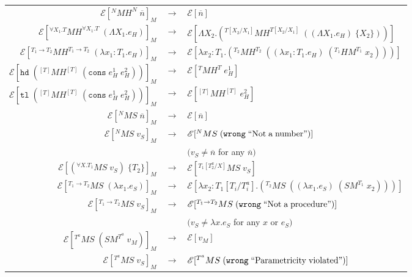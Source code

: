 \begin{figure}
\onehalfspacing
\begin{center}
\begin{tabular}{rcl}
$\mathscr{E}[^{N}MH^{N}\;\overline{n}]_{M}$ & $\rightarrow$ & $\mathscr{E}[\overline{n}]$ \\
$\mathscr{E}[^{\forall X_{1}.T}MH^{\forall X_{1}.T}\;(\Lambda X_{1}.e_{H})]_{M}$ & $\rightarrow$ & $\mathscr{E}[\Lambda X_{2}.(^{T[X_{2}/X_{1}]}MH^{T[X_{2}/X_{1}]}\;((\Lambda X_{1}.e_{H})\;\lbrace X_{2}\rbrace))]$ \\
$\mathscr{E}[^{T_{1}\rightarrow T_{2}}MH^{T_{1}\rightarrow T_{2}}\;(\lambda x_{1}:T_{1}.e_{H})]_{M}$ & $\rightarrow$ & $\mathscr{E}[\lambda x_{2}:T_{1}.(^{T_{2}}MH^{T_{2}}\;((\lambda x_{1}:T_{1}.e_{H})\;(^{T_{1}}HM^{T_{1}}\;x_{2})))]$ \\
$\mathscr{E}[\mathtt{hd}\;(^{[T]}MH^{[T]}\;(\mathtt{cons}\;e_{H}^{1}\;e_{H}^{2}))]_{M}$ & $\rightarrow$ & $\mathscr{E}[^{T}MH^{T}\;e_{H}^{1}]$ \\
$\mathscr{E}[\mathtt{tl}\;(^{[T]}MH^{[T]}\;(\mathtt{cons}\;e_{H}^{1}\;e_{H}^{2}))]_{M}$ & $\rightarrow$ & $\mathscr{E}[^{[T]}MH^{[T]}\;e_{H}^{2}]$ \\
$\mathscr{E}[^{N}MS\;\overline{n}]_{M}$ & $\rightarrow$ & $\mathscr{E}[\overline{n}]$ \\
$\mathscr{E}[^{N}MS\;v_{S}]_{M}$ & $\rightarrow$ & $\mathscr{E}[^{N}MS\;(\mathtt{wrong}\;\mathrm{``Not\;a\;number"})]$ \\
&& $(v_{S}\neq\overline{n}$ for any $\overline{n})$ \\
$\mathscr{E}[(^{\forall X.T_{1}}MS\;v_{S})\;\lbrace T_{2}\rbrace]_{M}$ & $\rightarrow$ & $\mathscr{E}[^{T_{1}[T^{a}_{2}/X]}MS\;v_{S}]$ \\
$\mathscr{E}[^{T_{1}\rightarrow T_{2}}MS\;(\lambda x_{1}.e_{S})]_{M}$ & $\rightarrow$ & $\mathscr{E}[\lambda x_{2}:T_{1}[T_{i}/T^{a}_{i}].(^{T_{2}}MS\;((\lambda x_{1}.e_{S})\;(SM^{T_{1}}\;x_{2})))]$ \\
$\mathscr{E}[^{T_{1}\rightarrow T_{2}}MS\;v_{S}]_{M}$ & $\rightarrow$ & $\mathscr{E}[^{T_{1}\rightarrow T_{2}}MS\;(\mathtt{wrong}\;\mathrm{``Not\;a\;procedure"})]$ \\
&& $(v_{S}\neq\lambda x.e_{S}$ for any $x$ or $e_{S})$ \\
$\mathscr{E}[^{T^{a}}MS\;(SM^{T^{a}}\;v_{M})]_{M}$ & $\rightarrow$ & $\mathscr{E}[v_{M}]$ \\
$\mathscr{E}[^{T^{a}}MS\;v_{S}]_{M}$ & $\rightarrow$ & $\mathscr{E}[^{T^{a}}MS\;(\mathtt{wrong}\;\mathrm{``Parametricity\;violated"})]$ \\

\end{tabular}
\end{center}
\end{figure}
